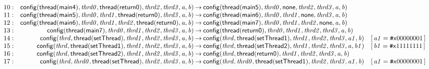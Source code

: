 \documentclass[a4paper]{article}
\newcommand{\ttsym}[1]{\mbox{\tt #1}}
\def\ttsharp{\ttsym{\symbol{35}}}
\newcommand{\symb}[1]{\mathsf{#1}}
\newcommand{\var}[1]{\mathit{#1}}
\newcommand{\Constraint}[1]{[\, #1 \,]}
\newcommand{\bv}[2][b]{{\ttsharp\symb{#1}{#2}}}
\begin{document}
\begin{landscape}
\[\begin{array}{rr@{\>}c@{\>}ll}
\mathrm{10} : 
 & \symb{config}(\symb{thread}(\symb{main4}),\var{thrd0},\symb{thread}(\symb{return0}),\var{thrd2},\var{thrd3},\var{a},\var{b})
 & \to 
 & \symb{config}(\symb{thread}(\symb{main5}),\var{thrd0},\symb{none},\var{thrd2},\var{thrd3},\var{a},\var{b})\\

\mathrm{11} : 
 & \symb{config}(\symb{thread}(\symb{main5}),\var{thrd0},\var{thrd1},\symb{thread}(\symb{return0}),\var{thrd3},\var{a},\var{b})
 & \to 
 & \symb{config}(\symb{thread}(\symb{main6}),\var{thrd0},\var{thrd1},\symb{none},\var{thrd3},\var{a},\var{b})\\

\mathrm{12} : 
 & \symb{config}(\symb{thread}(\symb{main6}),\var{thrd0},\var{thrd1},\var{thrd2},\symb{thread}(\symb{return0}),\var{a},\var{b})
 & \to 
 & \symb{config}(\symb{thread}(\symb{main7}),\var{thrd0},\var{thrd1},\var{thrd2},\symb{none},\var{a},\var{b})\\

\mathrm{13} : 
 & \symb{config}(\symb{thread}(\symb{main7}),\var{thrd0},\var{thrd1},\var{thrd2},\var{thrd3},\var{a},\var{b})
 & \to 
 & \symb{config}(\symb{thread}(\symb{return0}),\var{thrd0},\var{thrd1},\var{thrd2},\var{thrd3},\var{a},\var{b})\\

\mathrm{14} : 
 & \symb{config}(\var{thrd},\symb{thread}(\symb{setThread}),\var{thrd1},\var{thrd2},\var{thrd3},\var{a},\var{b})
 & \to 
 & \symb{config}(\var{thrd},\symb{thread}(\symb{setThread1}),\var{thrd1},\var{thrd2},\var{thrd3},\var{a1},\var{b})
 & \Constraint{\var{a1} = \bv[x]{00000001}}\\

\mathrm{15} : 
 & \symb{config}(\var{thrd},\symb{thread}(\symb{setThread1}),\var{thrd1},\var{thrd2},\var{thrd3},\var{a},\var{b})
 & \to 
 & \symb{config}(\var{thrd},\symb{thread}(\symb{setThread2}),\var{thrd1},\var{thrd2},\var{thrd3},\var{a},\var{b1})
 & \Constraint{\var{b1} = \bv[x]{11111111}}\\

\mathrm{16} : 
 & \symb{config}(\var{thrd},\symb{thread}(\symb{setThread2}),\var{thrd1},\var{thrd2},\var{thrd3},\var{a},\var{b})
 & \to 
 & \symb{config}(\var{thrd},\symb{thread}(\symb{return0}),\var{thrd1},\var{thrd2},\var{thrd3},\var{a},\var{b})\\

\mathrm{17} : 
 & \symb{config}(\var{thrd},\var{thrd0},\symb{thread}(\symb{setThread}),\var{thrd2},\var{thrd3},\var{a},\var{b})
 & \to 
 & \symb{config}(\var{thrd},\var{thrd0},\symb{thread}(\symb{setThread1}),\var{thrd2},\var{thrd3},\var{a1},\var{b})
 & \Constraint{\var{a1} = \bv[x]{00000001}}\\


\end{array}\]
\end{landscape}
\end{document}
